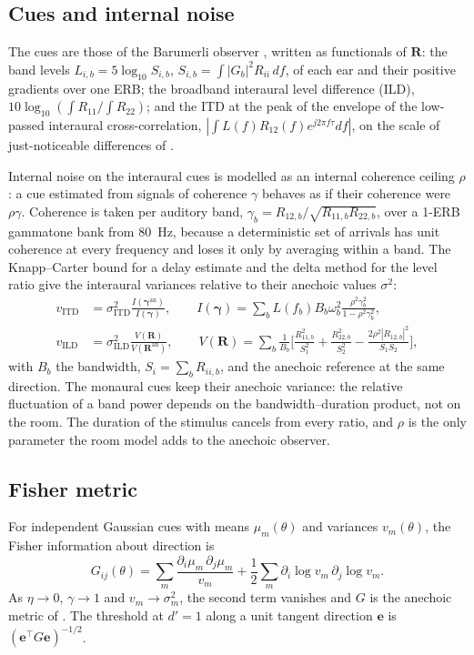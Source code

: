 \documentclass[11pt]{article}
\begin{document}
\subsection{Cues and internal noise}
The cues are those of the Barumerli observer \citep{barumerli2023}, written as functionals of $\bm R$: the band levels $L_{i,b}=5\log_{10}S_{i,b}$, $S_{i,b}=\int|G_b|^2R_{ii}\,df$, of each ear and their positive gradients over one ERB; the broadband interaural level difference (ILD), $10\log_{10}(\int R_{11}/\int R_{22})$; and the ITD at the peak of the envelope of the low-passed interaural cross-correlation, $|\int L(f)R_{12}(f)e^{j2\pi f\tau}df|$, on the scale of just-noticeable differences of \citet{reijniers2014}.

Internal noise on the interaural cues is modelled as an internal coherence ceiling $\rho$: a cue estimated from signals of coherence $\gamma$ behaves as if their coherence were $\rho\gamma$. Coherence is taken per auditory band, $\gamma_b=R_{12,b}/\sqrt{R_{11,b}R_{22,b}}$, over a 1-ERB gammatone bank from 80~Hz, because a deterministic set of arrivals has unit coherence at every frequency and loses it only by averaging within a band. The Knapp--Carter bound for a delay estimate \citep{knapp1976} and the delta method for the level ratio give the interaural variances relative to their anechoic values $\sigma^2$:
\begin{align}
v_{\mathrm{ITD}}&=\sigma_{\mathrm{ITD}}^2\frac{I(\bm\gamma^{\mathrm{an}})}{I(\bm\gamma)},\qquad I(\bm\gamma)=\sum_bL(f_b)B_b\omega_b^2\frac{\rho^2\gamma_b^2}{1-\rho^2\gamma_b^2},\\
v_{\mathrm{ILD}}&=\sigma_{\mathrm{ILD}}^2\frac{V(\bm R)}{V(\bm R^{\mathrm{an}})},\qquad V(\bm R)=\sum_b\frac1{B_b}\Big[\frac{R_{11,b}^2}{S_1^2}+\frac{R_{22,b}^2}{S_2^2}-\frac{2\rho^2|R_{12,b}|^2}{S_1S_2}\Big],
\end{align}
with $B_b$ the bandwidth, $S_i=\sum_bR_{ii,b}$, and the anechoic reference at the same direction. The monaural cues keep their anechoic variance: the relative fluctuation of a band power depends on the bandwidth--duration product, not on the room. The duration of the stimulus cancels from every ratio, and $\rho$ is the only parameter the room model adds to the anechoic observer.

\subsection{Fisher metric}
For independent Gaussian cues with means $\mu_m(\theta)$ and variances $v_m(\theta)$, the Fisher information about direction is
\begin{equation}
G_{ij}(\theta)=\sum_m\frac{\partial_i\mu_m\,\partial_j\mu_m}{v_m}+\frac12\sum_m\partial_i\log v_m\,\partial_j\log v_m .
\label{eq:G}
\end{equation}
As $\eta\to0$, $\gamma\to1$ and $v_m\to\sigma_m^2$, the second term vanishes and $G$ is the anechoic metric of \citet{bassett2026}. The threshold at $d'=1$ along a unit tangent direction $\bm e$ is $(\bm e^{\top}G\bm e)^{-1/2}$.
\end{document}
